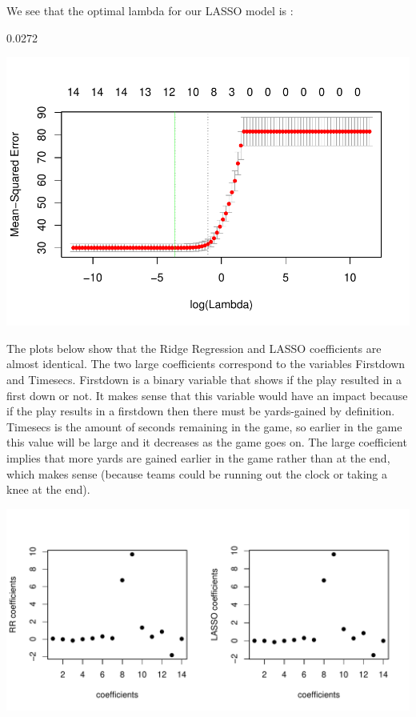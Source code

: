 \documentclass{article}
\begin{document}
\newpage

We see that the optimal lambda for our LASSO model is :


\begin{Schunk}
\begin{Soutput}
[1] 0.0272
\end{Soutput}
\end{Schunk}

\includegraphics{project4-008}

The plots below show that the Ridge Regression and LASSO coefficients are almost identical. The two large coefficients correspond to the variables Firstdown and Timesecs. Firstdown is a binary variable that shows if the play resulted in a first down or not. It makes sense that this variable would have an impact because if the play results in a firstdown then there must be yards-gained by definition. Timesecs is the amount of seconds remaining in the game, so earlier in the game this value will be large and it decreases as the game goes on. The large coefficient implies that more yards are gained earlier in the game rather than at the end, which makes sense (because teams could be running out the clock or taking a knee at the end). 

\includegraphics{project4-009}
\end{document}
